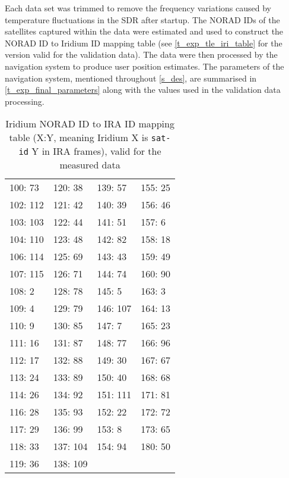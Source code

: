 Each data set was trimmed to remove the frequency variations caused by temperature fluctuations in the SDR after startup. The NORAD IDs of the satellites captured within the data were estimated and used to construct the NORAD ID to Iridium ID mapping table (see \autoref{t_exp_tle_iri_table} for the version valid for the validation data). The data were then processed by the navigation system to produce user position estimates. The parameters of the navigation system, mentioned throughout \autoref{s_des}, are summarised in \autoref{t_exp_final_parameters} along with the values used in the validation data processing.


\begin{table}
    \centering
    \begin{tabular}{llll}
100: 73  & 120: 38  & 139: 57  & 155: 25 \\
102: 112 & 121: 42  & 140: 39  & 156: 46 \\
103: 103 & 122: 44  & 141: 51  & 157: 6  \\
104: 110 & 123: 48  & 142: 82  & 158: 18 \\
106: 114 & 125: 69  & 143: 43  & 159: 49 \\
107: 115 & 126: 71  & 144: 74  & 160: 90 \\
108: 2   & 128: 78  & 145: 5   & 163: 3  \\
109: 4   & 129: 79  & 146: 107 & 164: 13 \\
110: 9   & 130: 85  & 147: 7   & 165: 23 \\
111: 16  & 131: 87  & 148: 77  & 166: 96 \\
112: 17  & 132: 88  & 149: 30  & 167: 67 \\
113: 24  & 133: 89  & 150: 40  & 168: 68 \\
114: 26  & 134: 92  & 151: 111 & 171: 81 \\
116: 28  & 135: 93  & 152: 22  & 172: 72 \\
117: 29  & 136: 99  & 153: 8   & 173: 65 \\
118: 33  & 137: 104 & 154: 94  & 180: 50 \\
119: 36  & 138: 109 &          &         \\
    \end{tabular}
    \caption[Iridium NORAD ID to IRA ID mapping table]{Iridium NORAD ID to IRA ID mapping table (X:Y, meaning Iridium X is \texttt{sat-id} Y in IRA frames), valid for the measured data}
    \label{t_exp_tle_iri_table}
\end{table}

